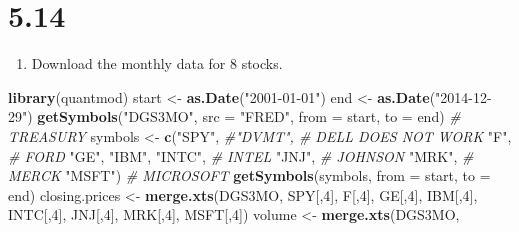 \documentclass[11pt,]{article}
\newenvironment{Shaded}{\begin{snugshade}}{\end{snugshade}}
\newcommand{\KeywordTok}[1]{\textcolor[rgb]{0.13,0.29,0.53}{\textbf{#1}}}
\newcommand{\DataTypeTok}[1]{\textcolor[rgb]{0.13,0.29,0.53}{#1}}
\newcommand{\DecValTok}[1]{\textcolor[rgb]{0.00,0.00,0.81}{#1}}
\newcommand{\StringTok}[1]{\textcolor[rgb]{0.31,0.60,0.02}{#1}}
\newcommand{\CommentTok}[1]{\textcolor[rgb]{0.56,0.35,0.01}{\textit{#1}}}
\newcommand{\NormalTok}[1]{#1}
\providecommand{\tightlist}{%
\setlength{\itemsep}{0pt}\setlength{\parskip}{0pt}}
\begin{document}
\newpage 

\section{5.14}\label{section-4}

\begin{enumerate}
\def\labelenumi{\arabic{enumi}.}
\tightlist
\item
  Download the monthly data for 8 stocks.
\end{enumerate}

\begin{Shaded}
\begin{Highlighting}[]
\KeywordTok{library}\NormalTok{(quantmod)}
\NormalTok{start <-}\StringTok{ }\KeywordTok{as.Date}\NormalTok{(}\StringTok{"2001-01-01"}\NormalTok{)}
\NormalTok{end <-}\StringTok{ }\KeywordTok{as.Date}\NormalTok{(}\StringTok{"2014-12-29"}\NormalTok{)}
\KeywordTok{getSymbols}\NormalTok{(}\StringTok{"DGS3MO"}\NormalTok{, }\DataTypeTok{src =} \StringTok{"FRED"}\NormalTok{, }\DataTypeTok{from =}\NormalTok{ start, }\DataTypeTok{to =}\NormalTok{ end) }\CommentTok{# TREASURY}
\NormalTok{symbols <-}\StringTok{ }\KeywordTok{c}\NormalTok{(}\StringTok{"SPY"}\NormalTok{, }
             \CommentTok{#"DVMT", # DELL DOES NOT WORK}
             \StringTok{"F"}\NormalTok{,  }\CommentTok{# FORD}
             \StringTok{"GE"}\NormalTok{, }
             \StringTok{"IBM"}\NormalTok{,}
             \StringTok{"INTC"}\NormalTok{, }\CommentTok{# INTEL}
             \StringTok{"JNJ"}\NormalTok{, }\CommentTok{# JOHNSON }
             \StringTok{"MRK"}\NormalTok{, }\CommentTok{# MERCK}
             \StringTok{"MSFT"}\NormalTok{) }\CommentTok{# MICROSOFT}
\KeywordTok{getSymbols}\NormalTok{(symbols, }\DataTypeTok{from =}\NormalTok{ start, }\DataTypeTok{to =}\NormalTok{ end) }
\NormalTok{closing.prices <-}\StringTok{ }\KeywordTok{merge.xts}\NormalTok{(DGS3MO,}
\NormalTok{                            SPY[,}\DecValTok{4}\NormalTok{], }
\NormalTok{                            F[,}\DecValTok{4}\NormalTok{], }
\NormalTok{                            GE[,}\DecValTok{4}\NormalTok{], }
\NormalTok{                            IBM[,}\DecValTok{4}\NormalTok{], }
\NormalTok{                            INTC[,}\DecValTok{4}\NormalTok{], }
\NormalTok{                            JNJ[,}\DecValTok{4}\NormalTok{], }
\NormalTok{                            MRK[,}\DecValTok{4}\NormalTok{], }
\NormalTok{                            MSFT[,}\DecValTok{4}\NormalTok{])}
\NormalTok{volume <-}\StringTok{ }\KeywordTok{merge.xts}\NormalTok{(DGS3MO,}

\end{Highlighting}
\end{Shaded}
\end{document}
